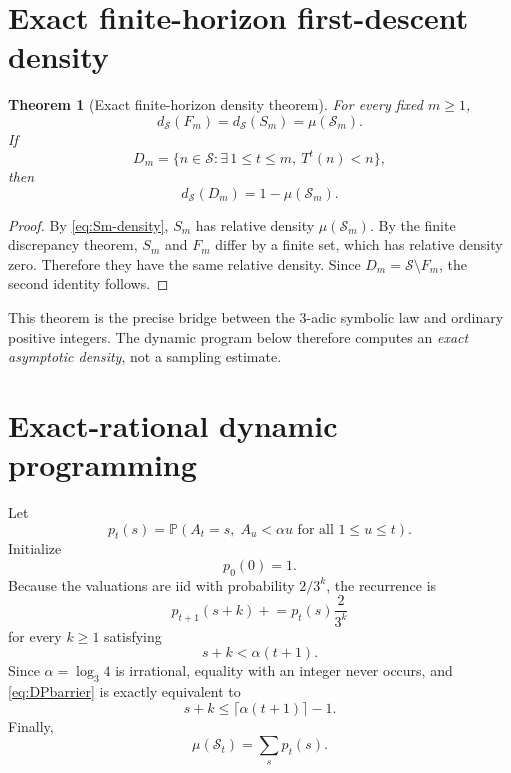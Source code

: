 \documentclass[11pt]{article}
\newtheorem{theorem}{Theorem}[section]
\theoremstyle{definition}
\theoremstyle{remark}
\newcommand{\Sset}{\mathcal S}
\newcommand{\Prob}{\mathbb P}
\newcommand{\ds}{d_{\Sset}}
\begin{document}
\section{Exact finite-horizon first-descent density}

\begin{theorem}[Exact finite-horizon density theorem]
For every fixed $m\ge1$,
\begin{equation}
\boxed{
\ds(F_m)=\ds(S_m)=\mu(\mathcal S_m).
}
\label{eq:finite-density}
\end{equation}
If
\begin{equation}
D_m=
\{n\in\Sset:\exists\,1\le t\le m,\ T^t(n)<n\},
\label{eq:Dm}
\end{equation}
then
\begin{equation}
\boxed{
\ds(D_m)=1-\mu(\mathcal S_m).
}
\label{eq:Dm-density}
\end{equation}
\end{theorem}

\begin{proof}
By \eqref{eq:Sm-density}, $S_m$ has relative density $\mu(\mathcal S_m)$.  By the finite discrepancy theorem, $S_m$ and $F_m$ differ by a finite set, which has relative density zero.  Therefore they have the same relative density.  Since $D_m=\Sset\setminus F_m$, the second identity follows.
\end{proof}

This theorem is the precise bridge between the $3$-adic symbolic law and ordinary positive integers.  The dynamic program below therefore computes an \emph{exact asymptotic density}, not a sampling estimate.

\section{Exact-rational dynamic programming}

Let
\begin{equation}
p_t(s)
=
\Prob\left(
A_t=s,\;
A_u<\alpha u\text{ for all }1\le u\le t
\right).
\label{eq:pts}
\end{equation}
Initialize
\[
p_0(0)=1.
\]
Because the valuations are iid with probability $2/3^k$, the recurrence is
\begin{equation}
p_{t+1}(s+k)
\mathrel{+}=
p_t(s)\frac{2}{3^k}
\label{eq:DP}
\end{equation}
for every $k\ge1$ satisfying
\begin{equation}
s+k<\alpha(t+1).
\label{eq:DPbarrier}
\end{equation}
Since $\alpha=\log_3 4$ is irrational, equality with an integer never occurs, and \eqref{eq:DPbarrier} is exactly equivalent to
\begin{equation}
s+k\le\lceil\alpha(t+1)\rceil-1.
\label{eq:DPinteger}
\end{equation}
Finally,
\begin{equation}
\boxed{
\mu(\mathcal S_t)=\sum_s p_t(s).
}
\label{eq:DPsum}
\end{equation}
\end{document}
